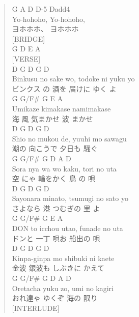 \documentclass[11pt]{article}
\begin{document}
\begin{verse}
G       A       D      D-5   Dadd4\\
Yo-hohoho, Yo-hohoho,\\
ヨホホホ、    ヨホホホ\\
\vspace*{1em}
\vspace*{1em}
[BRIDGE]\\
G  D  E  A\\
\vspace*{1em}
\vspace*{1em}
[VERSE]\\
D          G        D         G    D\\
Binkusu no sake wo, todoke ni yuku yo\\
ビンクス の  酒を     届けに     ゆく  よ\\
G  G/F\# G        E       A\\
Umikaze kimakase namimakase\\
海  風   気まかせ  波   まかせ\\
D         G       D        G  D\\
Shio no mukou de, yuuhi mo sawagu\\
潮の     向こうで   夕日も    騒ぐ\\
G    G/F\# G           D    A  D\\
Sora nya  wa wo kaku, tori no uta\\
空   にゃ  輪をかく     鳥   の  唄\\
\vspace*{1em}
D        G       D          G    D\\
Sayonara minato, tsumugi no sato yo\\
さよなら  港       つむぎの    里   よ\\
G      G/F\#   G       E       A\\
DON to icchou utao, funade no uta\\
ドンと  一丁    唄お   船出の    唄\\
D      G       D          G  D\\
Kinpa-ginpa mo shibuki ni kaete\\
金波   銀波も    しぶきに    かえて\\
G  G/F\#  G          D    A   D\\
Oretacha yuku zo, umi no kagiri\\
おれ達ゃ  ゆくぞ      海の  限り\\
\vspace*{1em}
\vspace*{1em}
[INTERLUDE]\\

\end{verse}
\end{document}
